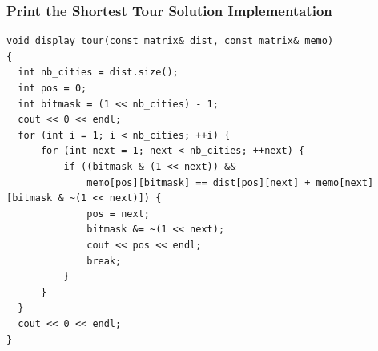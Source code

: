 \documentclass{beamer}
\newcommand{\cheflink}[2]{Code Chef (http://www.codechef.com)
  problem \href{#2}{\textcolor{blue}{#1}.}}
\newcounter{exo}
\newcommand{\exo}{
  \addtocounter{exo}{1}
  Exercice \arabic{exo}
}
\begin{document}

\ifanswers

\begin{frame}[containsverbatim]
\frametitle{Print the Shortest Tour Solution Implementation}

\scriptsize

\begin{lstlisting}
void display_tour(const matrix& dist, const matrix& memo)
{
  int nb_cities = dist.size();
  int pos = 0;
  int bitmask = (1 << nb_cities) - 1;
  cout << 0 << endl;
  for (int i = 1; i < nb_cities; ++i) {
      for (int next = 1; next < nb_cities; ++next) {
          if ((bitmask & (1 << next)) &&
              memo[pos][bitmask] == dist[pos][next] + memo[next][bitmask & ~(1 << next)]) {
              pos = next;
              bitmask &= ~(1 << next);
              cout << pos << endl;
              break;
          }
      }
  }
  cout << 0 << endl;
}
\end{lstlisting}


\end{frame}

\fi


\ifanswers
\end{document}
